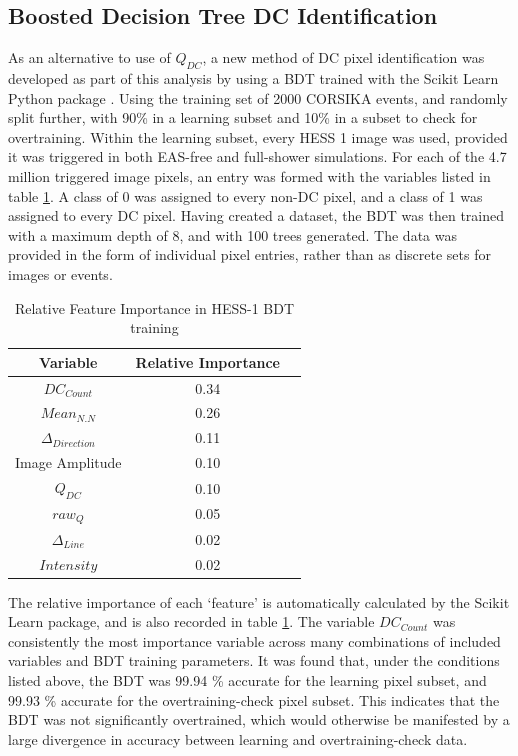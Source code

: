 \documentclass{article}
\begin{document}
\subsection{Boosted Decision Tree DC Identification}
As an alternative to use of $Q_{DC}$, a new method of DC pixel identification was developed as part of this analysis by using a BDT trained with the Scikit Learn Python package \cite{scikit-learn}. Using the training set of 2000 CORSIKA events, and randomly split further, with 90\% in a learning subset and 10\% in a subset to check for overtraining. Within the learning subset, every HESS 1 image was used, provided it was triggered in both EAS-free and full-shower simulations. For each of the 4.7 million triggered image pixels, an entry was formed with the variables listed in table \ref{tab:hess1classifier}. A class of 0 was assigned to every non-DC pixel, and a class of 1 was assigned to every DC pixel. Having created a dataset, the BDT was then trained with a maximum depth of 8, and with 100 trees generated. The data was provided in the form of individual pixel entries, rather than as discrete sets for images or events.

\begin{table}[h!]
  \centering
  \caption{Relative Feature Importance in HESS-1 BDT training}
  \label{tab:hess1classifier}
  \begin{tabular}{ccc}
    \toprule
    Variable & Relative Importance\\
    \midrule
    $DC_{Count}$ & 0.34\\
    $Mean_{N.N}$ & 0.26\\
    $\Delta_{Direction}$ & 0.11\\
    Image Amplitude & 0.10\\
    $Q_{DC}$ & 0.10\\
    $raw_{Q}$ & 0.05\\
    $\Delta_{Line}$ & 0.02\\
    $Intensity$ & 0.02\\
    \bottomrule
  \end{tabular}
\end{table}

The relative importance of each \textquoteleft feature' is automatically calculated by the Scikit Learn package, and is also recorded in table \ref{tab:hess1classifier}. The variable $DC_{Count}$ was consistently the most importance variable across many combinations of included variables and BDT training parameters. It was found that, under the conditions listed above, the BDT was 99.94 \% accurate for the learning pixel subset, and 99.93 \%  accurate for the overtraining-check pixel subset. This indicates that the BDT was not significantly overtrained, which would otherwise be manifested by a large divergence in accuracy between learning and overtraining-check data.
\end{document}
